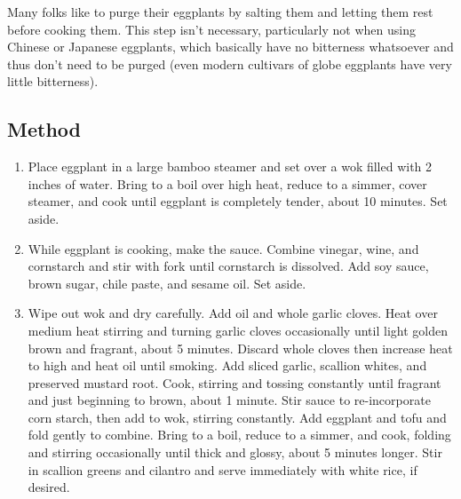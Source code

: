 Many folks like to purge their eggplants by salting them and letting them rest before cooking them. This step isn't necessary, particularly not when using Chinese or Japanese eggplants, which basically have no bitterness whatsoever and thus don't need to be purged (even modern cultivars of globe eggplants have very little bitterness).

\subsection{Method}

\begin{enumerate}
    \item Place eggplant in a large bamboo steamer and set over a wok filled with 2 inches of water. Bring to a boil over high heat, reduce to a simmer, cover steamer, and cook until eggplant is completely tender, about 10 minutes. Set aside.
    \item While eggplant is cooking, make the sauce. Combine vinegar, wine, and cornstarch and stir with fork until cornstarch is dissolved. Add soy sauce, brown sugar, chile paste, and sesame oil. Set aside.
    \item Wipe out wok and dry carefully. Add oil and whole garlic cloves. Heat over medium heat stirring and turning garlic cloves occasionally until light golden brown and fragrant, about 5 minutes. Discard whole cloves then increase heat to high and heat oil until smoking. Add sliced garlic, scallion whites, and preserved mustard root. Cook, stirring and tossing constantly until fragrant and just beginning to brown, about 1 minute. Stir sauce to re-incorporate corn starch, then add to wok, stirring constantly. Add eggplant and tofu and fold gently to combine. Bring to a boil, reduce to a simmer, and cook, folding and stirring occasionally until thick and glossy, about 5 minutes longer. Stir in scallion greens and cilantro and serve immediately with white rice, if desired.
\end{enumerate}
